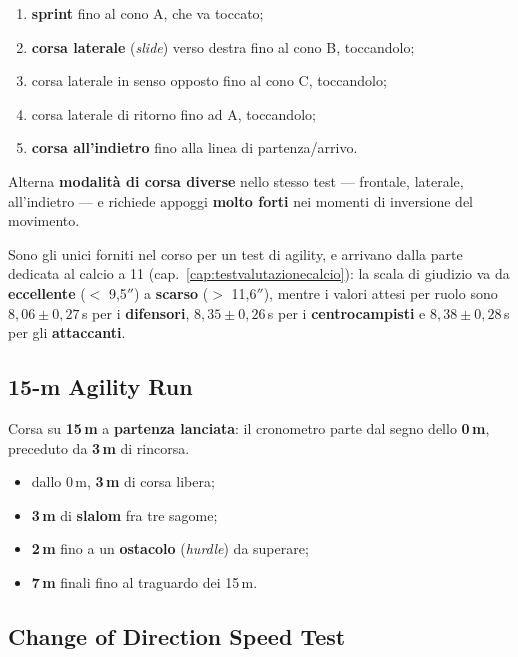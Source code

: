 \begin{enumerate}
  \item \textbf{sprint} fino al cono A, che va toccato;
  \item \textbf{corsa laterale} (\textit{slide}) verso destra fino al cono B, toccandolo;
  \item corsa laterale in senso opposto fino al cono C, toccandolo;
  \item corsa laterale di ritorno fino ad A, toccandolo;
  \item \textbf{corsa all'indietro} fino alla linea di partenza/arrivo.
\end{enumerate}

Alterna \textbf{modalità di corsa diverse} nello stesso test --- frontale, laterale, all'indietro
--- e richiede appoggi \textbf{molto forti} nei momenti di inversione del movimento.

Sono gli unici forniti nel corso per un test di agility, e arrivano dalla parte dedicata al calcio a
11 (cap.~\ref{cap:testvalutazionecalcio}): la scala di giudizio va da \textbf{eccellente}
($<$ 9,5$''$) a \textbf{scarso} ($>$ 11,6$''$), mentre i valori attesi per ruolo sono
$8{,}06 \pm 0{,}27$\,s per i \textbf{difensori}, $8{,}35 \pm 0{,}26$\,s per i
\textbf{centrocampisti} e $8{,}38 \pm 0{,}28$\,s per gli \textbf{attaccanti}.

\subsection{15-m Agility Run}

Corsa su \textbf{15\,m} a \textbf{partenza lanciata}: il cronometro parte dal segno dello
\textbf{0\,m}, preceduto da \textbf{3\,m} di rincorsa.
\begin{itemize}
  \item dallo 0\,m, \textbf{3\,m} di corsa libera;
  \item \textbf{3\,m} di \textbf{slalom} fra tre sagome;
  \item \textbf{2\,m} fino a un \textbf{ostacolo} (\textit{hurdle}) da superare;
  \item \textbf{7\,m} finali fino al traguardo dei 15\,m.
\end{itemize}

\subsection{Change of Direction Speed Test}


